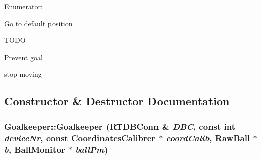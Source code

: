 \begin{Desc}
\item[Enumerator: ]\par
\begin{description}
\item[{\em 
\hypertarget{classGoalkeeper_a25db0bed632b4bdb87532b0fbbf45855af1fa8ff07676a5e27f9cc78f6811c704}{
GO\_\-TO\_\-DEF\_\-POS}
\label{classGoalkeeper_a25db0bed632b4bdb87532b0fbbf45855af1fa8ff07676a5e27f9cc78f6811c704}
}]Go to default position \item[{\em 
\hypertarget{classGoalkeeper_a25db0bed632b4bdb87532b0fbbf45855a16f1efd31d6ead68306d343d85059ca2}{
CLEAR\_\-GOAL}
\label{classGoalkeeper_a25db0bed632b4bdb87532b0fbbf45855a16f1efd31d6ead68306d343d85059ca2}
}]TODO \item[{\em 
\hypertarget{classGoalkeeper_a25db0bed632b4bdb87532b0fbbf45855a96b7bc8aa3f3a4d1b68955f8d757e9c1}{
PREVENT\_\-GOAL}
\label{classGoalkeeper_a25db0bed632b4bdb87532b0fbbf45855a96b7bc8aa3f3a4d1b68955f8d757e9c1}
}]Prevent goal \item[{\em 
\hypertarget{classGoalkeeper_a25db0bed632b4bdb87532b0fbbf45855a7940a4d0074c5f5bb33743797387c2c1}{
STOP}
\label{classGoalkeeper_a25db0bed632b4bdb87532b0fbbf45855a7940a4d0074c5f5bb33743797387c2c1}
}]stop moving \end{description}
\end{Desc}



\subsection{Constructor \& Destructor Documentation}
\hypertarget{classGoalkeeper_a7ad214162340c37a695ba00d4576c3c4}{
\subsubsection[{Goalkeeper}]{\setlength{\rightskip}{0pt plus 5cm}Goalkeeper::Goalkeeper (RTDBConn \& {\em DBC}, \/  const int {\em deviceNr}, \/  const {\bf CoordinatesCalibrer} $\ast$ {\em coordCalib}, \/  RawBall $\ast$ {\em b}, \/  {\bf BallMonitor} $\ast$ {\em ballPm})}}
\label{classGoalkeeper_a7ad214162340c37a695ba00d4576c3c4}


